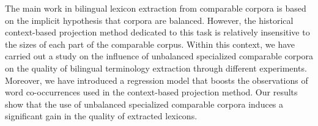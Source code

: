 The main work in bilingual lexicon extraction from comparable corpora is based on the implicit hypothesis that corpora are balanced. However, the historical context-based projection method dedicated to this task is relatively insensitive to the sizes of each part of the comparable corpus. Within this context, we have carried out a study on the influence of unbalanced specialized comparable corpora on the quality of bilingual terminology extraction through different experiments. Moreover, we have introduced a regression model that boosts the observations of word co-occurrences used in the context-based projection method. Our results show that the use of unbalanced specialized comparable corpora induces a significant gain in the quality of extracted lexicons.
